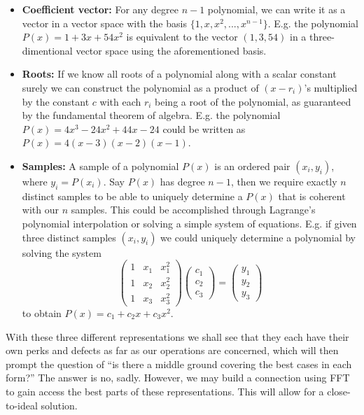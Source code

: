 \documentclass[../article.tex]{subfiles}
\begin{document}
\begin{itemize}
\item{\textbf{Coefficient vector:}} For any degree $n-1$ polynomial, we can write it as a vector in a vector space with the basis $\{1, x, x^2, ..., x^{n-1}\}$. E.g. the polynomial $P(x) = 1+3x+54x^2$ is equivalent to the vector $(1,3,54)$ in a three-dimentional vector space using the aforementioned basis.

\item{\textbf{Roots:}} If we know all roots of a polynomial along with a scalar constant surely we can construct the polynomial as a product of $(x-r_i)$'s multiplied by the constant $c$ with each $r_i$ being a root of the polynomial, as guaranteed by the fundamental theorem of algebra. E.g. the polynomial $P(x) = 4x^3-24x^2+44x-24$ could be written as $P(x) = 4(x-3)(x-2)(x-1)$.

\item{\textbf{Samples:}} A sample of a polynomial $P(x)$ is an ordered pair $(x_i,y_i)$, where $y_i = P(x_i)$. Say $P(x)$ has degree $n-1$, then we require exactly $n$ distinct samples to be able to uniquely determine a $P(x)$ that is coherent with our $n$ samples. This could be accomplished through Lagrange's polynomial interpolation or solving a simple system of equations. E.g. if given three distinct samples $(x_i,y_i)$ we could uniquely determine a polynomial by solving the system
\begin{equation*}
\begin{pmatrix}
1 & x_1 & x_1^2\\
1 & x_2 & x_2^2\\
1 & x_3 & x_3^2
\end{pmatrix}
\begin{pmatrix}
c_1\\
c_2\\
c_3
\end{pmatrix}
=
\begin{pmatrix}
y_1\\
y_2\\
y_3
\end{pmatrix}
\end{equation*}
to obtain $P(x) = c_1+c_2x+c_3x^2$.
\end{itemize}
With these three different representations we shall see that they each have their own perks and defects as far as our operations are concerned, which will then prompt the question of ``is there a middle ground covering the best cases in each form?'' The answer is no, sadly. However, we may build a connection using FFT to gain access the best parts of these representations. This will allow for a close-to-ideal solution.
\end{document}
